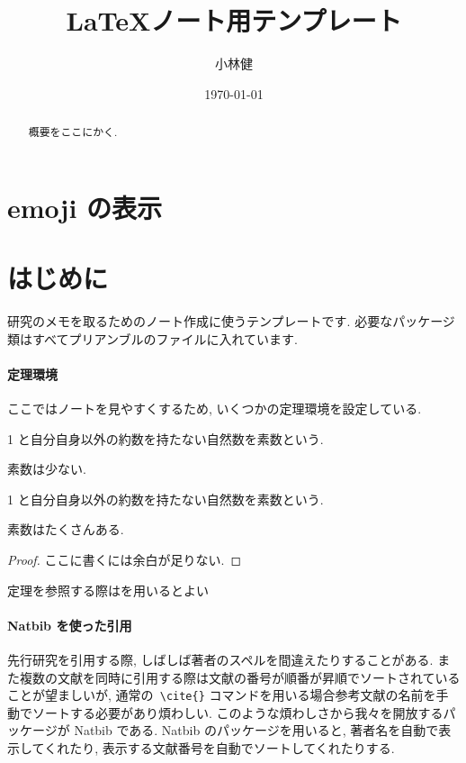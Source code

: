 \documentclass[12pt]{jlreq}
\title{\LaTeX ノート用テンプレート}
\author{小林健}
\date{\today}
\begin{document}
\maketitle
\begin{abstract}
    概要をここにかく. 
\end{abstract}

\section{emoji の表示}
\section{はじめに}
研究のメモを取るためのノート作成に使うテンプレートです. 
必要なパッケージ類はすべてプリアンブルのファイルに入れています. 

\paragraph{定理環境}
ここではノートを見やすくするため, いくつかの定理環境を設定している.


\begin{definition}[素数]
1 と自分自身以外の約数を持たない自然数を素数という. 
\end{definition}
\begin{lemma}
素数は少ない. 
\end{lemma}
\begin{definition}
1 と自分自身以外の約数を持たない自然数を素数という. 
\end{definition}


\begin{theorem}\label{thm:many}
素数はたくさんある. 
\end{theorem}


\begin{proof}
    ここに書くには余白が足りない. 
\end{proof}

定理を参照する際はを用いるとよい
\paragraph{Natbib を使った引用}
先行研究を引用する際, しばしば著者のスペルを間違えたりすることがある. 
また複数の文献を同時に引用する際は文献の番号が順番が昇順でソートされていることが望ましいが, 通常の\verb| \cite{}| コマンドを用いる場合参考文献の名前を手動でソートする必要があり煩わしい. 
このような煩わしさから我々を開放するパッケージが Natbib である.
Natbib のパッケージを用いると, 著者名を自動で表示してくれたり, 表示する文献番号を自動でソートしてくれたりする.
\end{document}
